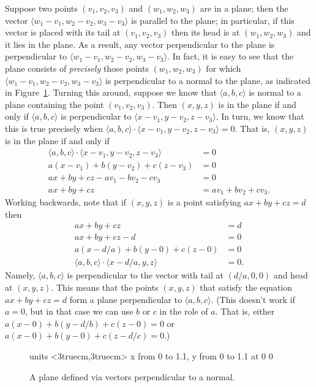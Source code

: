Suppose two points $(v_1,v_2,v_3)$ and $(w_1,w_2,w_3)$ are in a plane;
then the vector $\langle w_1-v_1,w_2-v_2,w_3-v_3\rangle$ is parallel
to the plane; in particular, if this vector is placed with its tail at
$(v_1,v_2,v_3)$ then its head is at $(w_1,w_2,w_3)$ and it lies in the
plane. As a result, any vector perpendicular to the plane is
perpendicular to $\langle w_1-v_1,w_2-v_2,w_3-v_3\rangle$. In fact, it
is easy to see that the plane consists of \emph{precisely} those points
$(w_1,w_2,w_3)$ for which $\langle w_1-v_1,w_2-v_2,w_3-v_3\rangle$ is
perpendicular to a normal to the plane, as indicated in 
Figure~\ref{fig:plane defined via perp vectors}. Turning this around, suppose
we know that $\langle a,b,c\rangle$ is normal to a plane containing
the point $(v_1,v_2,v_3)$. Then $(x,y,z)$ is in the plane if and only
if $\langle a,b,c\rangle$ is perpendicular to $\langle
x-v_1,y-v_2,z-v_3\rangle$. In turn, we know that this is true
precisely when $\langle a,b,c\rangle\cdot\langle
x-v_1,y-v_2,z-v_3\rangle=0$. That is, $(x,y,z)$ is in the plane if and
only if
\begin{align*}
  \langle a,b,c\rangle\cdot\langle x-v_1,y-v_2,z-v_3\rangle&=0	\\
  a(x-v_1)+b(y-v_2)+c(z-v_3)&=0	\\
  ax+by+cz-av_1-bv_2-cv_3&=0	\\
  ax+by+cz&=av_1+bv_2+cv_3.
\end{align*}
Working backwards, note that if $(x,y,z)$ is a point satisfying 
$ax+by+cz=d$ then
\begin{align*}
  ax+by+cz&=d	\\
  ax+by+cz-d&=0	\\
  a(x-d/a)+b(y-0)+c(z-0)&=0	\\
  \langle a,b,c\rangle\cdot\langle x-d/a,y,z\rangle&=0.
\end{align*}
Namely, $\langle a,b,c\rangle$ is perpendicular to the vector with
tail at $(d/a,0,0)$ and head at $(x,y,z)$. This means that the points
$(x,y,z)$ that satisfy the equation $ax+by+cz=d$ form a plane
perpendicular to $\langle a,b,c\rangle$. (This doesn't
work if $a=0$, but in that case we can use $b$ or $c$ in the role of
$a$. That is, either $a(x-0)+b(y-d/b)+c(z-0)=0$ or 
$a(x-0)+b(y-0)+c(z-d/c)=0$.)

\begin{figure}[H]
\centerline{
\vbox{\beginpicture
\normalgraphs
\setcoordinatesystem units <3truecm,3truecm>
\setplotarea x from 0 to 1.1, y from 0 to 1.1
 at 0 0
\endpicture}}
\caption{A plane defined via vectors perpendicular to a normal. \label{fig:plane defined via perp vectors}}
\end{figure}

